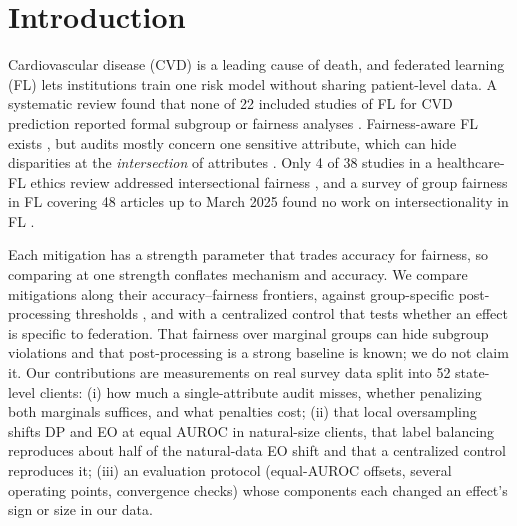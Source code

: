 \documentclass[conference]{IEEEtran}
\begin{document}
\section{Introduction}
Cardiovascular disease (CVD) is a leading cause of death, and federated learning (FL) \cite{mcmahan2017} lets institutions train one risk model without sharing patient-level data. A systematic review found that none of 22 included studies of FL for CVD prediction reported formal subgroup or fairness analyses \cite{li2026}. Fairness-aware FL exists \cite{li2020qffl,ezzeldin2023,li2025fairfml,wu2025fedida}, but audits mostly concern one sensitive attribute, which can hide disparities at the \emph{intersection} of attributes \cite{crenshaw1989,buolamwini2018,foulds2020,kearns2018}. Only 4 of 38 studies in a healthcare-FL ethics review addressed intersectional fairness \cite{mir2026}, and a survey of group fairness in FL covering 48 articles up to March 2025 found no work on intersectionality in FL \cite{salazar2024}.

Each mitigation has a strength parameter that trades accuracy for fairness, so comparing at one strength conflates mechanism and accuracy. We compare mitigations along their accuracy--fairness frontiers, against group-specific post-processing thresholds \cite{hardt2016}, and with a centralized control that tests whether an effect is specific to federation. That fairness over marginal groups can hide subgroup violations \cite{kearns2018,foulds2020} and that post-processing is a strong baseline \cite{hardt2016} is known; we do not claim it. Our contributions are measurements on real survey data split into 52 state-level clients: (i) how much a single-attribute audit misses, whether penalizing both marginals suffices, and what penalties cost; (ii) that local oversampling shifts DP and EO at equal AUROC in natural-size clients, that label balancing reproduces about half of the natural-data EO shift and that a centralized control reproduces it; (iii) an evaluation protocol (equal-AUROC offsets, several operating points, convergence checks) whose components each changed an effect's sign or size in our data.
\end{document}
